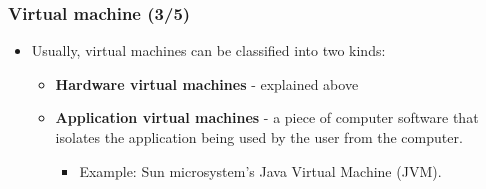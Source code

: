 \documentclass[CJKutf8,xcolor=pdftex,dvipsnames,table]{beamer}
\begin{document}
\begin{CJK*}{UTF8}{song}
  \begin{frame}
    \frametitle{Virtual machine (3/5)} \pause
    \begin{itemize}
    \item{Usually, virtual machines can be classified into two kinds:} \pause
      \begin{itemize}
      \item{\textbf{Hardware virtual machines} \pause - explained above} \pause
      \item{\textbf{Application virtual machines} \pause - a piece of computer software that isolates the application being used by the user from the computer. } \pause
        \begin{itemize}
        \item{Example: Sun microsystem's Java Virtual Machine (JVM).}
        \end{itemize}
      \end{itemize}
    \end{itemize}
  \end{frame}
  


\end{CJK*}
\end{document}
